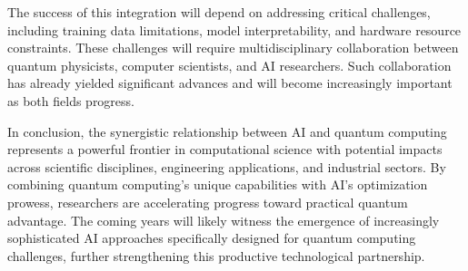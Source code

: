 The success of this integration will depend on addressing critical challenges, including training data limitations, model interpretability, and hardware resource constraints. These challenges will require multidisciplinary collaboration between quantum physicists, computer scientists, and AI researchers. Such collaboration has already yielded significant advances and will become increasingly important as both fields progress.

In conclusion, the synergistic relationship between AI and quantum computing represents a powerful frontier in computational science with potential impacts across scientific disciplines, engineering applications, and industrial sectors. By combining quantum computing's unique capabilities with AI's optimization prowess, researchers are accelerating progress toward practical quantum advantage. The coming years will likely witness the emergence of increasingly sophisticated AI approaches specifically designed for quantum computing challenges, further strengthening this productive technological partnership. 